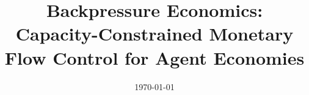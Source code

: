 \documentclass[11pt]{article}
\title{\textbf{Backpressure Economics:} \\
Capacity-Constrained Monetary Flow Control for Agent Economies}
\author{}
\date{\today}
\theoremstyle{definition}
\theoremstyle{remark}
\begin{document}
\maketitle

\begin{abstract}

\end{abstract}



















\end{document}
